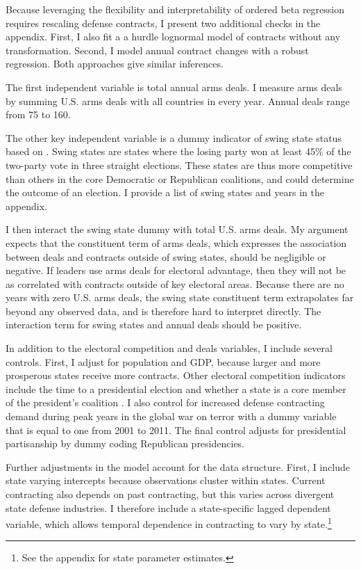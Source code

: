 \documentclass[12pt]{article}
\begin{document}
Because leveraging the flexibility and interpretability of ordered beta regression requires rescaling defense contracts, I present two additional checks in the appendix. 
First, I also fit a a hurdle lognormal model of contracts without any transformation.
Second, I model annual contract changes with a robust regression. 
Both approaches give similar inferences.


The first independent variable is total annual arms deals.  
I measure arms deals by summing U.S. arms deals with all countries in every year. 
Annual deals range from 75 to 160. 


The other key independent variable is a dummy indicator of swing state status based on \citet{KrinerReeves2015}.
Swing states are states where the losing party won at least 45\% of the two-party vote in three straight elections.
These states are thus more competitive than others in the core Democratic or Republican coalitions, and could determine the outcome of an election.
I provide a list of swing states and years in the appendix.   


I then interact the swing state dummy with total U.S. arms deals. 
My argument expects that the constituent term of arms deals, which expresses the association between deals and contracts outside of swing states, should be negligible or negative.
If leaders use arms deals for electoral advantage, then they will not be as correlated with contracts outside of key electoral areas. 
Because there are no years with zero U.S. arms deals, the swing state constituent term extrapolates far beyond any observed data, and is therefore hard to interpret directly. 
The interaction term for swing states and annual deals should be positive.


In addition to the electoral competition and deals variables, I include several controls. 
First, I adjust for population and GDP, because larger and more prosperous states receive more contracts. 
Other electoral competition indicators include the time to a presidential election and whether a state is a core member of the president's coalition \citep{KrinerReeves2015}. 
I also control for increased defense contracting demand during peak years in the global war on terror with a dummy variable that is equal to one from 2001 to 2011. 
The final control adjusts for presidential partisanship by dummy coding Republican presidencies. 


Further adjustments in the model account for the data structure.
First, I include state varying intercepts because observations cluster within states. 
Current contracting also depends on past contracting, but this varies across divergent state defense industries. 
I therefore include a state-specific lagged dependent variable, which allows temporal dependence in contracting to vary by state.\footnote{See the appendix for state parameter estimates.}
\end{document}
